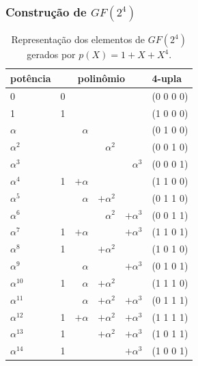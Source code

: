 \documentclass[portuguese,aspectratio=169]{beamer}
\begin{document}
\begin{frame}
  \frametitle{Construção de $GF(2^4)$}
  \begin{footnotesize}
  \begin{table}
    \caption{Representação dos elementos de $GF(2^4)$ gerados por $p(X)=1+X+X^4$.}
    \begin{tabular}{lrrrrl}
      potência & \multicolumn{4}{c}{polinômio} & 4-upla \\
      \hline
      0          & 0 & & & & (0 0 0 0)\\ 
      1          & 1 & & & & (1 0 0 0) \\
      $\alpha$   & & $\alpha$ & & & (0 1 0 0) \\
      $\alpha^2$ & & & $\alpha^2$ & & (0 0 1 0) \\
      $\alpha^3$ & & & & $\alpha^3$ & (0 0 0 1) \\
      $\alpha^4$ & 1 & $+\alpha$ & & & (1 1 0 0) \\
      $\alpha^5$ & & $\alpha$ & $+\alpha^2$ & & (0 1 1 0) \\
      $\alpha^6$ & & & $\alpha^2$ & $+\alpha^3$ & (0 0 1 1)\\
      $\alpha^7$ & 1 & $+\alpha$ & & $+\alpha^3$ & (1 1 0 1) \\
      $\alpha^8$ & 1 & & $+\alpha^2$ & & (1 0 1 0) \\
      $\alpha^9$ & & $\alpha$ & & $+\alpha^3$ & (0 1 0 1) \\
      $\alpha^{10}$ & 1 & $\alpha$ & $+\alpha^2$ & & (1 1 1 0) \\
      $\alpha^{11}$ & & $\alpha$ & $+\alpha^2$ & $+\alpha^3$ & (0 1 1 1) \\
      $\alpha^{12}$ & 1 & $+\alpha$ & $+\alpha^2$ & $+\alpha^3$ & (1 1 1 1) \\
      $\alpha^{13}$ & 1 & & $+\alpha^2$ & $+\alpha^3$ & (1 0 1 1) \\
      $\alpha^{14}$ & 1 & & & $+\alpha^3$ & (1 0 0 1)
    \end{tabular}
  \end{table}
  \end{footnotesize}
\end{frame}
\end{document}
